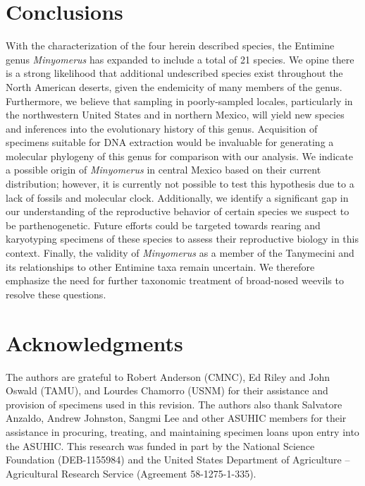 \documentclass[fleqn,10pt,lineno]{wlpeerj} %
\begin{document}
\section*{Conclusions}
	With the characterization of the four herein described species, the Entimine genus \textit{Minyomerus} has expanded to include a total of 21 species.
	We opine there is a strong likelihood that additional undescribed species exist throughout the North American deserts, given the endemicity of many members of the genus.
	Furthermore, we believe that sampling in poorly-sampled locales, particularly in the northwestern United States and in northern Mexico, will yield new species and inferences into the evolutionary history of this genus.
	Acquisition of specimens suitable for DNA extraction would be invaluable for generating a molecular phylogeny of this genus for comparison with our analysis.
	We indicate a possible origin of \textit{Minyomerus} in central Mexico based on their current distribution; however, it is currently not possible to test this hypothesis due to a lack of fossils and molecular clock.
	Additionally, we identify a significant gap in our understanding of the reproductive behavior of certain species we suspect to be parthenogenetic.
	Future efforts could be targeted towards rearing and karyotyping specimens of these species to assess their reproductive biology in this context.
	Finally, the validity of \textit{Minyomerus} as a member of the Tanymecini and its relationships to other Entimine taxa remain uncertain.
	We therefore emphasize the need for further taxonomic treatment of broad-nosed weevils to resolve these questions.
		
\section*{Acknowledgments}
	The authors are grateful to Robert Anderson (CMNC), Ed Riley and John Oswald (TAMU), and Lourdes Chamorro (USNM) for their assistance and provision of specimens used in this revision.
	The authors also thank Salvatore Anzaldo, Andrew Johnston, Sangmi Lee and other ASUHIC members for their assistance in procuring, treating, and maintaining specimen loans upon entry into the ASUHIC.
	This research was funded in part by the National Science Foundation (DEB-1155984) and the United States Department of Agriculture -- Agricultural Research Service (Agreement 58-1275-1-335).
\end{document}

